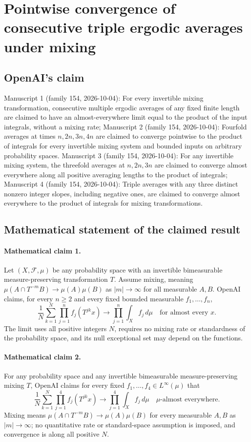 \documentclass[11pt]{article}
\begin{document}
\section*{Pointwise convergence of consecutive triple ergodic averages under mixing}

\subsection{OpenAI's claim}
Manuscript 1 (family 154, 2026-10-04): For every invertible mixing transformation, consecutive multiple ergodic averages of any fixed finite length are claimed to have an almost-everywhere limit equal to the product of the input integrals, without a mixing rate; Manuscript 2 (family 154, 2026-10-04): Fourfold averages at times $n,2n,3n,4n$ are claimed to converge pointwise to the product of integrals for every invertible mixing system and bounded inputs on arbitrary probability spaces. Manuscript 3 (family 154, 2026-10-04): For any invertible mixing system, the threefold averages at $n,2n,3n$ are claimed to converge almost everywhere along all positive averaging lengths to the product of integrals; Manuscript 4 (family 154, 2026-10-04): Triple averages with any three distinct nonzero integer slopes, including negative ones, are claimed to converge almost everywhere to the product of integrals for mixing transformations.

\subsection{Mathematical statement of the claimed result}
\paragraph{Mathematical claim 1.} Let $(X,\mathcal F,\mu)$ be any probability space with an invertible bimeasurable measure-preserving transformation $T$. Assume mixing, meaning $\mu(A\cap T^{-m}B)\to\mu(A)\mu(B)$ as $|m|\to\infty$ for all measurable $A,B$. OpenAI claims, for every $n\ge2$ and every fixed bounded measurable $f_1,\ldots,f_n$,
\[
\frac1N\sum_{k=1}^N\prod_{j=1}^n f_j(T^{jk}x)\longrightarrow\prod_{j=1}^n\int_X f_j\,d\mu
\quad\text{for almost every }x.
\]
The limit uses all positive integers $N$, requires no mixing rate or standardness of the probability space, and its null exceptional set may depend on the functions.

\paragraph{Mathematical claim 2.} For any probability space and any invertible bimeasurable measure-preserving mixing $T$, OpenAI claims for every fixed $f_1,\ldots,f_4\in L^\infty(\mu)$ that
\[
\frac1N\sum_{k=1}^N\prod_{j=1}^4 f_j(T^{jk}x)\longrightarrow\prod_{j=1}^4\int_X f_j\,d\mu
\quad\mu\text{-almost everywhere}.
\]
Mixing means $\mu(A\cap T^{-m}B)\to\mu(A)\mu(B)$ for every measurable $A,B$ as $|m|\to\infty$; no quantitative rate or standard-space assumption is imposed, and convergence is along all positive $N$.
\end{document}

